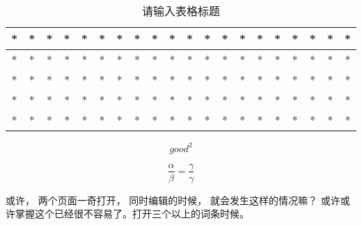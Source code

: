
\begin{table}[ht]
\centering
\caption{请输入表格标题}\label{test_tab1}
\begin{tabular}{|c|c|c|c|c|c|c|c|c|c|c|c|c|c|c|c|c|c|c|c|}
\hline
* & * & * & * & * & * & * & * & * & * & * & * & * & * & * & * & * & * & * & * \\
\hline
* & * & * & * & * & * & * & * & * & * & * & * & * & * & * & * & * & * & * & * \\
\hline
* & * & * & * & * & * & * & * & * & * & * & * & * & * & * & * & * & * & * & * \\
\hline
* & * & * & * & * & * & * & * & * & * & * & * & * & * & * & * & * & * & * & * \\
\hline
* & * & * & * & * & * & * & * & * & * & * & * & * & * & * & * & * & * & * & * \\
\hline
\end{tabular}
\end{table}

\begin{equation}
good^2
\end{equation}

\begin{equation}
\frac{\alpha}{\beta} = \frac{\gamma}{\gamma}
\end{equation}

或许， 两个页面一奇打开， 同时编辑的时候， 就会发生这样的情况嘛？
或许或许掌握这个已经很不容易了。打开三个以上的词条时候。
